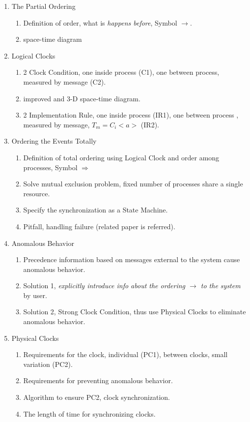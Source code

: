 \documentclass[12pt,a4paper,oneside]{article}
\begin{document}
\begin{enumerate}
  \item The Partial Ordering
  \begin{enumerate}
      \item Definition of order, what is \textit{happens before}, Symbol $\rightarrow$. %
      \item space-time diagram
  \end{enumerate}
  \item Logical Clocks
  \begin{enumerate}
      \item 2 Clock Condition, one inside process (C1), one between process, measured by message (C2).
      \item improved and 3-D space-time diagram.
      \item 2 Implementation Rule, one inside process (IR1), one between process , measured by message, $T_m = C_i<a>$ (IR2).
  \end{enumerate}
  \item Ordering the Events Totally
  \begin{enumerate}
      \item Definition of total ordering using Logical Clock and order among processes, Symbol $\Rightarrow$
      \item Solve mutual exclusion problem, fixed number of processes share a single resource.
      \item Specify the synchronization as a State Machine.
      \item Pitfall, handling failure (related paper is referred).
  \end{enumerate}
  \item Anomalous Behavior
  \begin{enumerate}
      \item Precedence information based on messages external to the system cause anomalous behavior.
      \item Solution 1, \textit{explicitly introduce info about the ordering $\rightarrow$ to the system} by user.
      \item Solution 2, Strong Clock Condition, thus use Physical Clocks to eliminate anomalous behavior.
  \end{enumerate}
  \item Physical Clocks
  \begin{enumerate}
      \item Requirements for the clock, individual (PC1), between clocks, small variation (PC2).
      \item Requirements for preventing anomalous behavior.
      \item Algorithm to ensure PC2, clock synchronization.
      \item The length of time for synchronizing clocks.
  \end{enumerate}
\end{enumerate}
\end{document}
